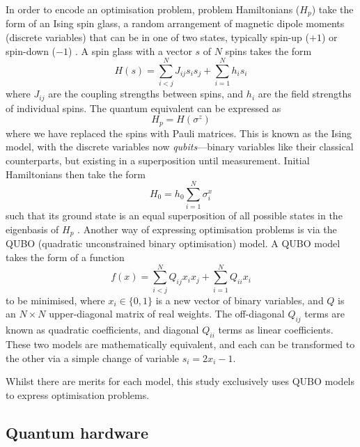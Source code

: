 \documentclass[twocolumn]{article}
\theoremstyle{definition}
\begin{document}
In order to encode an optimisation problem, problem Hamiltonians ($H_p$) take the form of an Ising spin glass, a random arrangement of magnetic dipole moments (discrete variables) that can be in one of two states, typically spin-up ($+1$) or spin-down ($-1$) \cite{lucas_ising_2014}. A spin glass with a vector $s$ of $N$ spins takes the form
\begin{equation}
    H(s) = \sum_{i<j}^{N}J_{ij}s_i s_j + \sum_{i=1}^{N}h_i s_i
    \label{eq:ising}
\end{equation}
where $J_{ij}$ are the coupling strengths between spins, and $h_i$ are the field strengths of individual spins. The quantum equivalent can be expressed as
\begin{equation}
    H_p = H(\sigma^z)
\end{equation}
where we have replaced the spins with Pauli matrices. This is known as the Ising model, with the discrete variables now \emph{qubits}---binary variables like their classical counterparts, but existing in a superposition until measurement. Initial Hamiltonians then take the form
\begin{equation}
    H_0 = h_0\sum_{i=1}^{N}\sigma_i^x
\end{equation}
such that its ground state is an equal superposition of all possible states in the eigenbasis of $H_p$ \cite{boixo_experimental_2013}.
Another way of expressing optimisation problems is via the QUBO (quadratic unconstrained binary optimisation) model. A QUBO model takes the form of a function
\begin{equation}
    f(x)=\sum^N_{i<j}Q_{ij}x_ix_j + \sum^N_{i=1}Q_{ii}x_i
    \label{eq:qubo}
\end{equation}
to be minimised, where $x_i\in\{0,1\}$ is a new vector of binary variables, and $Q$ is an $N\times N$ upper-diagonal matrix of real weights. The off-diagonal $Q_{ij}$ terms are known as quadratic coefficients, and diagonal $Q_{ii}$ terms as linear coefficients. These two models are mathematically equivalent, and each can be transformed to the other via a simple change of variable ${s_i = 2x_i - 1}$.

Whilst there are merits for each model, this study exclusively uses QUBO models to express optimisation problems.

\subsection*{Quantum hardware}
\end{document}
